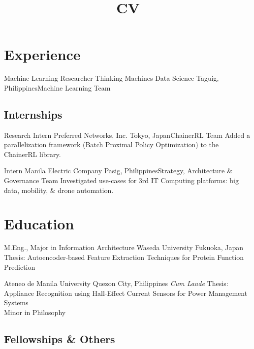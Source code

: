 \documentclass[11pt,a4paper,sans]{moderncv}
\title{CV}
\begin{document}
\maketitle

\section{Experience}
        {Machine Learning Researcher}
        {Thinking Machines Data Science}
        {Taguig, Philippines}{Machine Learning Team}
        {
        }

\subsection{Internships}

        {Research Intern}
        {Preferred Networks, Inc.}
        {Tokyo, Japan}{ChainerRL Team}
        {Added a parallelization framework (Batch Proximal Policy Optimization) to the ChainerRL library.}

        {Intern}
        {Manila Electric Company}
        {Pasig, Philippines}{Strategy, Architecture \& Governance Team}
        {Investigated use-cases for 3rd IT Computing platforms: big data,
        mobility, \& drone automation.}


\section{Education}
        {M.Eng., Major in Information Architecture}
        {Waseda University}
        {Fukuoka, Japan}{}
        {Thesis: Autoencoder-based Feature Extraction Techniques for Protein
        Function Prediction}

        {Ateneo de Manila University}
        {Quezon City, Philippines}
        {\textit{Cum Laude}}
        {
        Thesis: Appliance Recognition using Hall-Effect Current Sensors for
        Power Management Systems\\
        Minor in Philosophy
        }


\subsection{Fellowships \& Others}
\end{document}
